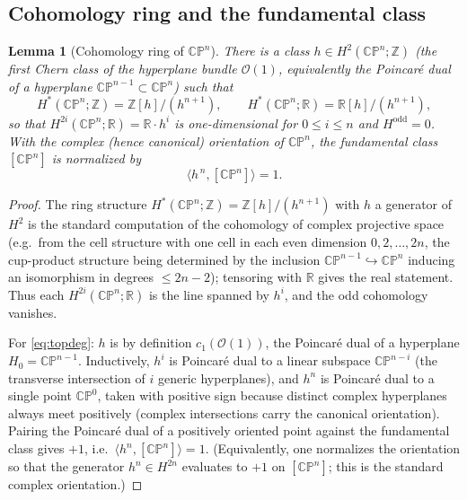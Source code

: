 \documentclass[12pt]{article}
\newtheorem{lemma}{Lemma}
\theoremstyle{definition}
\begin{document}
\subsection*{Cohomology ring and the fundamental class}

\begin{lemma}[Cohomology ring of $\mathbb{CP}^n$]\label{lem:cpring}
There is a class $h\in H^2(\mathbb{CP}^n;\mathbb{Z})$ (the first Chern class of the
hyperplane bundle $\mathcal{O}(1)$, equivalently the Poincar\'e dual of a hyperplane
$\mathbb{CP}^{n-1}\subset\mathbb{CP}^n$) such that
\[
H^*(\mathbb{CP}^n;\mathbb{Z})=\mathbb{Z}[h]/(h^{n+1}),
\qquad
H^*(\mathbb{CP}^n;\mathbb{R})=\mathbb{R}[h]/(h^{n+1}),
\]
so that $H^{2i}(\mathbb{CP}^n;\mathbb{R})=\mathbb{R}\cdot h^i$ is one-dimensional for
$0\le i\le n$ and $H^{\mathrm{odd}}=0$.  With the complex (hence canonical) orientation of
$\mathbb{CP}^n$, the fundamental class $[\mathbb{CP}^n]$ is normalized by
\[
\big\langle h^{\,n},[\mathbb{CP}^n]\big\rangle=1.
\tag{$\ast$}\label{eq:topdeg}
\]
\end{lemma}

\begin{proof}
The ring structure $H^*(\mathbb{CP}^n;\mathbb{Z})=\mathbb{Z}[h]/(h^{n+1})$ with
$h$ a generator of $H^2$ is the standard computation of the cohomology of complex
projective space (e.g.\ from the cell structure with one cell in each even dimension
$0,2,\dots,2n$, the cup-product structure being determined by the inclusion
$\mathbb{CP}^{n-1}\hookrightarrow\mathbb{CP}^n$ inducing an isomorphism in degrees
$\le 2n-2$); tensoring with $\mathbb{R}$ gives the real statement.  Thus each
$H^{2i}(\mathbb{CP}^n;\mathbb{R})$ is the line spanned by $h^i$, and the odd cohomology
vanishes.

For \eqref{eq:topdeg}: $h$ is by definition $c_1(\mathcal{O}(1))$, the Poincar\'e dual of
a hyperplane $H_0=\mathbb{CP}^{n-1}$.  Inductively, $h^i$ is Poincar\'e dual to a linear
subspace $\mathbb{CP}^{n-i}$ (the transverse intersection of $i$ generic hyperplanes), and
$h^n$ is Poincar\'e dual to a single point $\mathbb{CP}^0$, taken with positive sign
because distinct complex hyperplanes always meet positively (complex intersections carry
the canonical orientation).  Pairing the Poincar\'e dual of a positively oriented point
against the fundamental class gives $+1$, i.e.\ $\langle h^n,[\mathbb{CP}^n]\rangle=1$.
(Equivalently, one normalizes the orientation so that the generator $h^n\in H^{2n}$
evaluates to $+1$ on $[\mathbb{CP}^n]$; this is the standard complex orientation.)
\end{proof}
\end{document}
